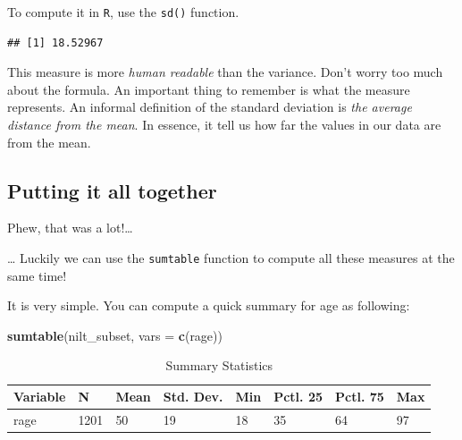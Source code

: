 \documentclass[
]{book}
\newenvironment{Shaded}{\begin{snugshade}}{\end{snugshade}}
\newcommand{\AttributeTok}[1]{\textcolor[rgb]{0.13,0.29,0.53}{#1}}
\newcommand{\FunctionTok}[1]{\textcolor[rgb]{0.13,0.29,0.53}{\textbf{#1}}}
\newcommand{\NormalTok}[1]{#1}
\newcommand{\SpecialCharTok}[1]{\textcolor[rgb]{0.81,0.36,0.00}{\textbf{#1}}}
\newcommand{\StringTok}[1]{\textcolor[rgb]{0.31,0.60,0.02}{#1}}
\begin{document}
To compute it in \texttt{R}, use the \texttt{sd()} function.

\begin{Shaded}
\end{Shaded}

\begin{verbatim}
## [1] 18.52967
\end{verbatim}

This measure is more \emph{human readable} than the variance. Don't worry too much about the formula. An important thing to remember is what the measure represents. An informal definition of the standard deviation is \emph{the average distance from the mean}. In essence, it tell us how far the values in our data are from the mean.

\hypertarget{putting-it-all-together}{%
\subsection{Putting it all together}\label{putting-it-all-together}}

Phew, that was a lot!\ldots{}

\ldots{} Luckily we can use the \texttt{sumtable} function to compute all these measures at the same time!

It is very simple. You can compute a quick summary for age as following:

\begin{Shaded}
\begin{Highlighting}[]
\FunctionTok{sumtable}\NormalTok{(nilt\_subset, }\AttributeTok{vars =} \FunctionTok{c}\NormalTok{(}\StringTok{\textquotesingle{}rage\textquotesingle{}}\NormalTok{))}
\end{Highlighting}
\end{Shaded}

\begin{table}

\caption{\label{tab:unnamed-chunk-59}Summary Statistics}
\centering
\begin{tabular}[t]{llllllll}
\toprule
Variable & N & Mean & Std. Dev. & Min & Pctl. 25 & Pctl. 75 & Max\\
\midrule
rage & 1201 & 50 & 19 & 18 & 35 & 64 & 97\\
\bottomrule
\end{tabular}
\end{table}
\end{document}
